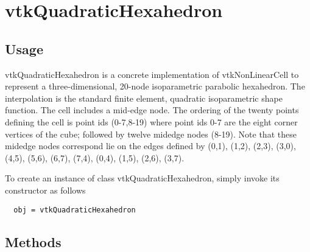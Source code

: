 \section{vtkQuadraticHexahedron}

\subsection{Usage}

 vtkQuadraticHexahedron is a concrete implementation of vtkNonLinearCell to
 represent a three-dimensional, 20-node isoparametric parabolic
 hexahedron. The interpolation is the standard finite element, quadratic
 isoparametric shape function. The cell includes a mid-edge node. The
 ordering of the twenty points defining the cell is point ids (0-7,8-19)
 where point ids 0-7 are the eight corner vertices of the cube; followed by
 twelve midedge nodes (8-19). Note that these midedge nodes correspond lie
 on the edges defined by (0,1), (1,2), (2,3), (3,0), (4,5), (5,6), (6,7),
 (7,4), (0,4), (1,5), (2,6), (3,7).

To create an instance of class vtkQuadraticHexahedron, simply
invoke its constructor as follows
\begin{verbatim}
  obj = vtkQuadraticHexahedron
\end{verbatim}
\subsection{Methods}

